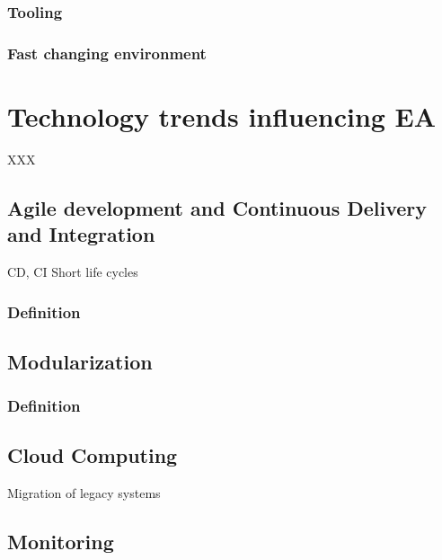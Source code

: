 
\subsubsection{Tooling}


\subsubsection{Fast changing environment}


\section{Technology trends influencing EA}

XXX

\subsection{Agile development and Continuous Delivery and Integration}

CD, CI
Short life cycles

\subsubsection{Definition}

\subsection{Modularization}
\subsubsection{Definition}

\subsection{Cloud Computing}

Migration of legacy systems

\subsection{Monitoring}

